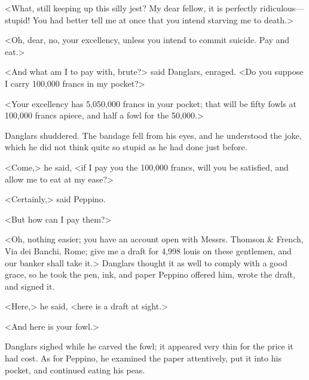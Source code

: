  <What, still keeping up this silly jest? My dear fellow, it is perfectly ridiculous—stupid! You had better tell me at once that you intend starving me to death.> 

 <Oh, dear, no, your excellency, unless you intend to commit suicide. Pay and eat.> 

 <And what am I to pay with, brute?> said Danglars, enraged. <Do you suppose I carry 100,000 francs in my pocket?> 

 <Your excellency has 5,050,000 francs in your pocket; that will be fifty fowls at 100,000 francs apiece, and half a fowl for the 50,000.> 

 Danglars shuddered. The bandage fell from his eyes, and he understood the joke, which he did not think quite so stupid as he had done just before. 

 <Come,> he said, <if I pay you the 100,000 francs, will you be satisfied, and allow me to eat at my ease?> 

 <Certainly,> said Peppino. 

 <But how can I pay them?> 

 <Oh, nothing easier; you have an account open with Messrs. Thomson \& French, Via dei Banchi, Rome; give me a draft for 4,998 louis on these gentlemen, and our banker shall take it.>  Danglars thought it as well to comply with a good grace, so he took the pen, ink, and paper Peppino offered him, wrote the draft, and signed it. 

 <Here,> he said, <here is a draft at sight.> 

 <And here is your fowl.> 

 Danglars sighed while he carved the fowl; it appeared very thin for the price it had cost. As for Peppino, he examined the paper attentively, put it into his pocket, and continued eating his peas. 